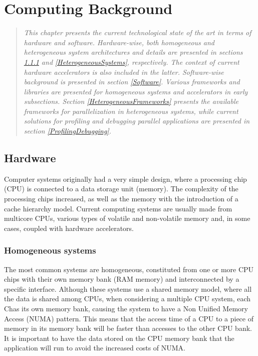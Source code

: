 \chapter{Computing Background}
\label{TechnologicalBackground}

\begin{quote}
\textit{This chapter presents the current technological state of the art in terms of hardware and software. Hardware-wise, both homogeneous and heterogeneous system architectures and details are presented in sections \ref{HomogeneousSystems} and \ref{HeterogeneousSystems}, respectively. The context of current hardware accelerators is also included in the latter. Software-wise background is presented in section \ref{Software}. Various frameworks and libraries are presented for homogeneous systems and accelerators in early subsections. Section \ref{HeterogeneousFrameworks} presents the available frameworks for parallelization in heterogeneous systems, while current solutions for profiling and debugging parallel applications are presented in section \ref{ProfilingDebugging}.}
\end{quote}

\section{Hardware}
\label{Hardware}

Computer systems originally had a very simple design, where a processing chip (CPU) is connected to a data storage unit (memory). The complexity of the processing chips increased, as well as the memory with the introduction of a cache hierarchy model. Current computing systems are usually made from multicore CPUs, various types of volatile and non-volatile memory and, in some cases, coupled with hardware accelerators.

\subsection{Homogeneous systems}
\label{HomogeneousSystems}

The most common systems are homogeneous, constituted from one or more CPU chips with their own memory bank (RAM memory) and interconnected by a specific interface. Although these systems use a shared memory model, where all the data is shared among CPUs, when considering a multiple CPU system, each Chas its own memory bank, causing the system to have a Non Unified Memory Access (NUMA) pattern. This means that the access time of a CPU to a piece of memory in its memory bank will be faster than accesses to the other CPU bank. It is important to have the data stored on the CPU memory bank that the application will run to avoid the increased costs of NUMA.

